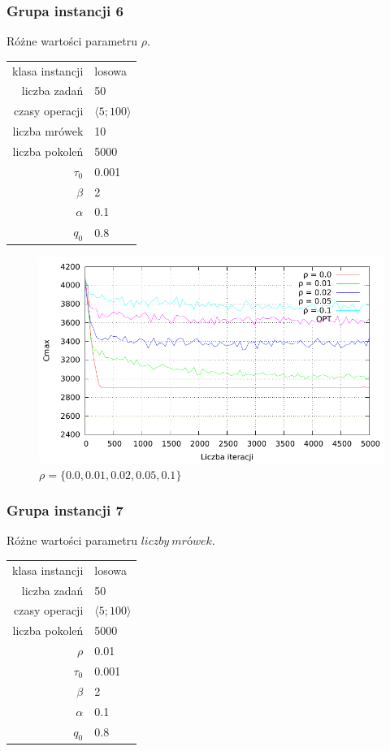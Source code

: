 \documentclass[10pt,a4paper]{article}
\begin{document}
\newpage
\subsubsection{Grupa instancji 6}
Różne wartości parametru $\rho$.

\begin{center}
\begin{tabular}{|r|l|}
  \hline
  klasa instancji & losowa \\
  liczba zadań & 50 \\
  czasy operacji & $ \langle 5;100 \rangle $  \\
  liczba mrówek & 10 \\
  liczba pokoleń & 5000 \\
  $ \tau_0 $ & 0.001 \\
  $ \beta $ & 2 \\
  $ \alpha $ & 0.1 \\
  $ q_0 $ & 0.8 \\
  \hline
\end{tabular}
\end{center}

\begin{figure}[h]
    \centering
    \includegraphics{./figures/inst_01_rnd_evapor_smooth.pdf}
    \caption{$ \rho = \{ 0.0, 0.01, 0.02, 0.05, 0.1 \} $}
\end{figure}


\newpage
\subsubsection{Grupa instancji 7}
Różne wartości parametru $liczby\ mrówek$.

\begin{center}
\begin{tabular}{|r|l|}
  \hline
  klasa instancji & losowa \\
  liczba zadań & 50 \\
  czasy operacji & $ \langle 5;100 \rangle $  \\
  liczba pokoleń & 5000 \\
  $ \rho $ & 0.01 \\
  $ \tau_0 $ & 0.001 \\
  $ \beta $ & 2 \\
  $ \alpha $ & 0.1 \\
  $ q_0 $ & 0.8 \\
  \hline
\end{tabular}
\end{center}
\end{document}
